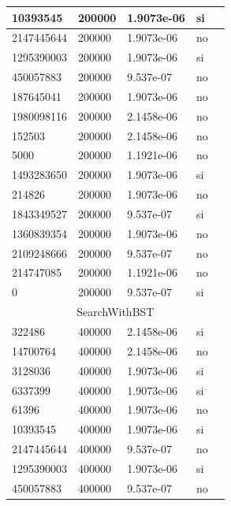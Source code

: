 \documentclass[12pt, fleqn]{article}                             %
\theoremstyle{break}                                            %
\begin{document}
\begin{longtable}{|m{5em}|m{5em}|m{10em}|m{5em}|@{}m{0pt}@{}}
            10393545& 200000  & 1.9073e-06 & si &\\[1em]    \hline
            2147445644& 200000  & 1.9073e-06 & no &\\[1em]    \hline
            1295390003& 200000  & 1.9073e-06 & si &\\[1em]    \hline
            450057883& 200000  & 9.537e-07 & no &\\[1em]    \hline
            187645041& 200000  & 1.9073e-06 & no &\\[1em]    \hline
            1980098116& 200000  & 2.1458e-06 & no &\\[1em]    \hline
            152503& 200000  & 2.1458e-06 & no &\\[1em]    \hline
            5000& 200000  & 1.1921e-06 & no &\\[1em]    \hline
            1493283650& 200000  & 1.9073e-06 & si &\\[1em]    \hline
            214826& 200000  & 1.9073e-06 & no &\\[1em]    \hline
            1843349527& 200000  & 9.537e-07 & si &\\[1em]    \hline
            1360839354& 200000  & 1.9073e-06 & no &\\[1em]    \hline
            2109248666& 200000  & 9.537e-07 & no &\\[1em]    \hline
            214747085& 200000  & 1.1921e-06 & no &\\[1em]    \hline
            0& 200000  & 9.537e-07 & si &\\[1em]    \hline
            \multicolumn{5}{|c|}{SearchWithBST}   \\          \hline
            322486& 400000  & 2.1458e-06 & si &\\[1em]    \hline
            14700764& 400000  & 2.1458e-06 & no &\\[1em]    \hline
            3128036& 400000  & 1.9073e-06 & si &\\[1em]    \hline
            6337399& 400000  & 1.9073e-06 & si &\\[1em]    \hline
            61396& 400000  & 1.9073e-06 & no &\\[1em]    \hline
            10393545& 400000  & 1.9073e-06 & si &\\[1em]    \hline
            2147445644& 400000  & 9.537e-07 & no &\\[1em]    \hline
            1295390003& 400000  & 1.9073e-06 & si &\\[1em]    \hline
            450057883& 400000  & 9.537e-07 & no &\\[1em]    \hline

\end{longtable}
\end{document}
